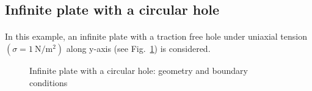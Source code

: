 



\subsection{Infinite plate with a circular hole}
\paragraph{}
In this example, an infinite plate with a traction free hole under uniaxial tension $(\sigma = \SI{1}{\newton \per \meter^2} ) $ along y-axis (see Fig.~\ref{adap_fig:ex_chole_geo_bc}) is considered.
\begin{figure}[h!]
    \centering
    \caption{Infinite plate with a circular hole: geometry and boundary conditions}
    \label{adap_fig:ex_chole_geo_bc}
\end{figure}

